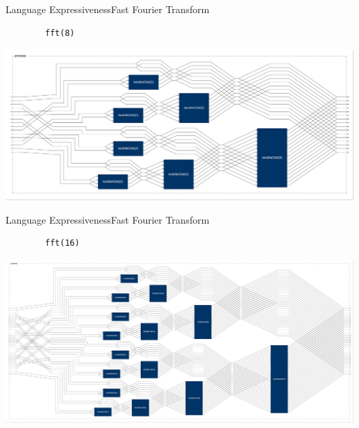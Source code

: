 \begin{frame}[fragile,shrink=30]{Language Expressiveness}{Fast Fourier Transform}
    \vspace{1cm}
    \begin{lstlisting}
        fft(8)
    \end{lstlisting}

    \begin{center}
        \includegraphics[width=1\textwidth]{images/fft8}
    \end{center}
\end{frame}
    
\begin{frame}[fragile,shrink=30]{Language Expressiveness}{Fast Fourier Transform}
    \vspace{1cm}
    \begin{lstlisting}
        fft(16)
    \end{lstlisting}

    \begin{center}
        \includegraphics[width=1\textwidth]{images/fft16}
    \end{center}
\end{frame}
    
